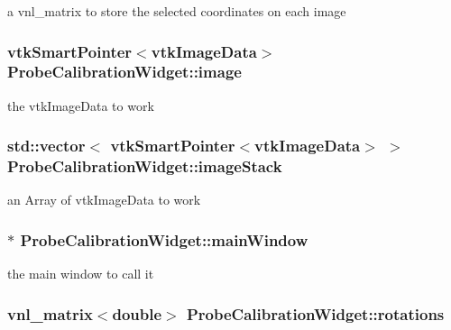 a vnl\-\_\-matrix to store the selected coordinates on each image 

\hypertarget{class_probe_calibration_widget_a5f639b7a6f3c520427f245e44c51c962}{
\subsubsection[{image}]{\setlength{\rightskip}{0pt plus 5cm}vtk\-Smart\-Pointer$<$vtk\-Image\-Data$>$ {\bf Probe\-Calibration\-Widget\-::image}}}\label{d2/d39/class_probe_calibration_widget_a5f639b7a6f3c520427f245e44c51c962}


the vtk\-Image\-Data to work 

\hypertarget{class_probe_calibration_widget_adf05803fc62518128463039d5b46ac28}{
\subsubsection[{image\-Stack}]{\setlength{\rightskip}{0pt plus 5cm}std\-::vector$<$ vtk\-Smart\-Pointer$<$vtk\-Image\-Data$>$ $>$ {\bf Probe\-Calibration\-Widget\-::image\-Stack}}}\label{d2/d39/class_probe_calibration_widget_adf05803fc62518128463039d5b46ac28}


an Array of vtk\-Image\-Data to work 

\hypertarget{class_probe_calibration_widget_aee1fb564f8f3e03cd8d932cabe6716b4}{
\subsubsection[{main\-Window}]{$\ast$ {\bf Probe\-Calibration\-Widget\-::main\-Window}}}\label{d2/d39/class_probe_calibration_widget_aee1fb564f8f3e03cd8d932cabe6716b4}
the main window to call it \hypertarget{class_probe_calibration_widget_ac723f22e498e6c58360a021302caf723}{
\subsubsection[{rotations}]{\setlength{\rightskip}{0pt plus 5cm}vnl\-\_\-matrix$<$double$>$ {\bf Probe\-Calibration\-Widget\-::rotations}}}\label{d2/d39/class_probe_calibration_widget_ac723f22e498e6c58360a021302caf723}


